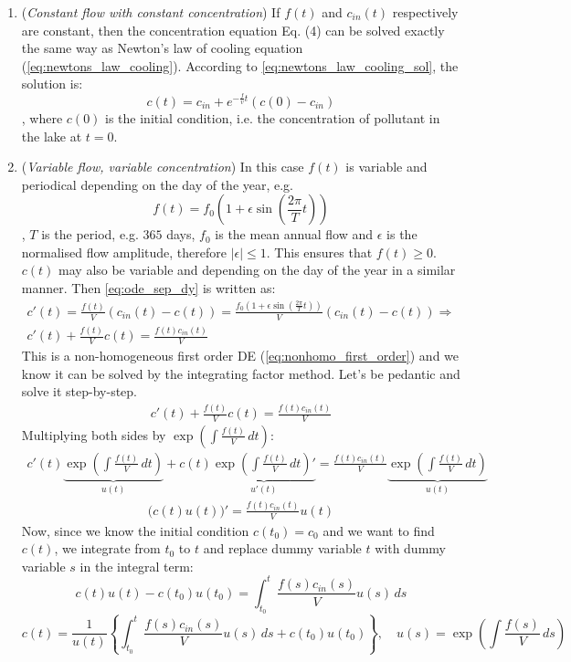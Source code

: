 \documentclass[a4paper]{article}
\begin{document}
\begin{enumerate}
    \item (\textit{Constant flow with constant concentration}) If $f(t)$ and $c_{in}(t)$ respectively are constant,  then the concentration equation Eq. (4) can be solved exactly the same way as Newton's law of cooling equation (\eqref{eq:newtons_law_cooling}). According to \eqref{eq:newtons_law_cooling_sol}, the solution is:
    \[
        c(t) = c_{in} + e^{-\frac{f}{v}t} (c(0) - c_{in})
    \]
    , where $c(0)$ is the initial condition, i.e. the concentration of pollutant in the lake at $t=0$.
    
    \item (\textit{Variable flow, variable concentration}) In this case $f(t)$ is variable and periodical depending on the day of the year, e.g. 
    \[
        f(t) = f_0\left(1 + \epsilon\sin\left(\frac{2\pi}{T}t\right)\right)
    \]
    , $T$ is the period, e.g. $365$ days, $f_0$ is the mean annual flow and $\epsilon$ is the normalised flow amplitude, therefore $\left| \epsilon \right| \leq 1$. This ensures that $f(t) \geq 0$. $c(t)$ may also be variable and depending on the day of the year in a similar manner. Then \eqref{eq:ode_sep_dy} is written as:
    \begin{gather*}
        c'(t) = \frac{f(t)}{V}\left(c_{in}(t) - c(t)\right) = \frac{f_0\left(1 + \epsilon\sin\left(\frac{2\pi}{T}t\right)\right)}{V}\left(c_{in}(t) - c(t)\right) \Rightarrow \\
        c'(t) +\frac{f(t)}{V}c(t) = \frac{f(t)c_{in}(t)}{V}
        \tag{5}
    \end{gather*}
    This is a non-homogeneous first order DE (\eqref{eq:nonhomo_first_order}) and we know it  can be solved by the integrating factor method. Let's be pedantic and solve it step-by-step.
    \begin{gather*}
        c'(t) +\frac{f(t)}{V}c(t) = \frac{f(t)c_{in}(t)}{V}
    \end{gather*}
    Multiplying both sides by $\exp\left(\int \frac{f(t)}{V}\, dt\right)$:
    \begin{gather*}
        c'(t)\underbrace{\exp\left(\int \frac{f(t)}{V}\, dt\right)}_{u(t)} + c(t)\underbrace{\exp \left(\int \frac{f(t)}{V}\, dt\right)'}_{u'(t)} = \frac{f(t)c_{in}(t)}{V} \underbrace{\exp\left(\int \frac{f(t)}{V}\, dt\right)}_{u(t)}
    \end{gather*}
    \begin{gather*}
        \big( c(t)u(t) \big)' =  \frac{f(t)c_{in}(t)}{V} u(t)
    \end{gather*}
    Now, since we know the initial condition $c(t_0) = c_0$ and we want to find $c(t)$, we integrate from $t_0$ to $t$ and replace dummy variable $t$ with dummy variable $s$ in the integral term:
    \[
        c(t)u(t) - c(t_0)u(t_0) = \int_{t_0}^t \frac{f(s)c_{in}(s)}{V} u(s) \, ds
    \]
    \[
        c(t) = \frac{1}{u(t)}
        \left\{  \int_{t_0}^t  \frac{f(s)c_{in}(s)}{V} u(s) \, ds + c(t_0)u(t_0) \right\}, \quad u(s) = \exp \left(\int\frac{f(s)}{V}\, ds\right)
        \label{eq:ode_lake_general_sol}
        \tag{6}
    \]
\end{enumerate}
\end{document}
